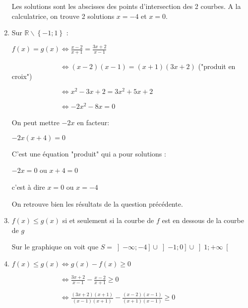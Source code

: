 \begin{corrige}
\begin{enumerate}
\begin{center}
\end{center}
          Les solutions sont les abscisses des points d'intersection des 2 courbes. A la calculatrice, on trouve 2 solutions $x=-4$ et $x=0$.
          \item
          Sur $\mathbb{R}\backslash\left\{-1 ; 1\right\}$ :
          \par
          $f\left(x\right) = g\left(x\right)  \Leftrightarrow  \frac{x-2}{x+1} = \frac{3x+2}{x-1}$
          \par
          $\phantom{f\left(x\right) = g\left(x\right)} \Leftrightarrow (x-2)(x-1)=(x+1)(3x+2)$ ("produit en croix")
          \par
          $\phantom{f\left(x\right) = g\left(x\right)} \Leftrightarrow x^2-3x+2=3x^2+5x+2$
          \par
          $\phantom{f\left(x\right) = g\left(x\right)} \Leftrightarrow -2x^2-8x=0$
          \par
          On peut mettre $-2x$ en facteur:
          \par
          $-2x(x+4)=0$
          \par
          C'est une équation "produit" qui a pour solutions :
          \par
          $-2x=0$ ou $x+4=0$
          \par
          c'est à dire $x=0$ ou $x=-4$
          \par
          On retrouve bien les résultats de la question précédente.
          \item
          $f\left(x\right)\leqslant g\left(x\right)$ si et seulement si la courbe de $f$ est en dessous de la courbe de $g$
          \par
          Sur le graphique on voit que $S=\left]-\infty ;-4\right] \cup  \left]-1;0\right] \cup  \left]1;+\infty \right[$
          \item
          $f\left(x\right)\leqslant g\left(x\right)  \Leftrightarrow  g\left(x\right)-f\left(x\right) \geqslant 0$
          \par
          $\phantom{f\left(x\right)\leqslant g\left(x\right)} \Leftrightarrow  \frac{3x+2}{x-1}-\frac{x-2}{x+1} \geqslant  0  $
          \par
          $\phantom{f\left(x\right)\leqslant g\left(x\right)} \Leftrightarrow  \frac{\left(3x+2\right)\left(x+1\right)}{\left(x-1\right)\left(x+1\right)}-\frac{\left(x-2\right)\left(x-1\right)}{\left(x+1\right)\left(x-1\right)} \geqslant  0  $

\end{enumerate}
\end{corrige}
